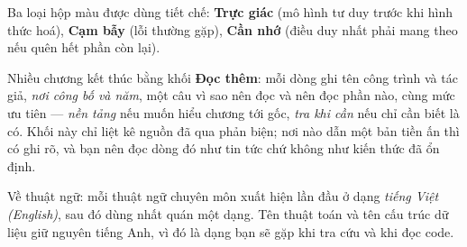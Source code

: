 \documentclass[algorithm.tex]{subfiles}
\begin{document}
Ba loại hộp màu được dùng tiết chế: \textbf{Trực giác} (mô hình tư duy trước khi hình thức hoá), \textbf{Cạm bẫy} (lỗi thường gặp), \textbf{Cần nhớ} (điều duy nhất phải mang theo nếu quên hết phần còn lại).

Nhiều chương kết thúc bằng khối \textbf{Đọc thêm}: mỗi dòng ghi tên công trình và tác giả, \emph{nơi công bố và năm}, một câu vì sao nên đọc và nên đọc phần nào, cùng mức ưu tiên --- \emph{nền tảng} nếu muốn hiểu chương tới gốc, \emph{tra khi cần} nếu chỉ cần biết là có. Khối này chỉ liệt kê nguồn đã qua phản biện; nơi nào dẫn một bản tiền ấn thì có ghi rõ, và bạn nên đọc dòng đó như tin tức chứ không như kiến thức đã ổn định.

Về thuật ngữ: mỗi thuật ngữ chuyên môn xuất hiện lần đầu ở dạng \emph{tiếng Việt (English)}, sau đó dùng nhất quán một dạng. Tên thuật toán và tên cấu trúc dữ liệu giữ nguyên tiếng Anh, vì đó là dạng bạn sẽ gặp khi tra cứu và khi đọc code.
\end{document}
